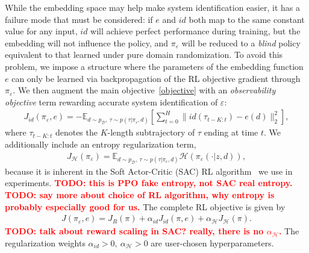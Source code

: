 \documentclass{article}
\newcommand{\E}{\mathbb{E}}
\newcommand{\TODO}[1]{\textcolor{red}{\textbf{TODO: #1}}}
\newcommand{\cH}{\mathcal{H}}
\newcommand{\cN}{\mathcal{N}}
\newcommand{\blind}{\emph{blind}}
\newcommand{\embedfn}{e}
\newcommand{\idfn}{id}
\newcommand{\idset}{\mathcal{D}}
\newcommand{\obvar}{z}
\newcommand{\idvar}{d}
\newcommand{\idpdf}{p_{\idset}}
\newcommand{\latvar}{\varepsilon}
\begin{document}
While the embedding space may help make system identification easier,
it has a failure mode that must be considered:
if $\embedfn$ and $\idfn$ both map to the same constant value for any input,
$\idfn$ will achieve perfect performance during training,
but the embedding will not influence the policy, and $\pi_\latvar$ will be reduced to a \blind{} policy
equivalent to that learned under pure domain randomization.
To avoid this problem, we impose a structure where the parameters of the embedding function $e$
can only be learned via backpropagation of the RL objective gradient through $\pi_\latvar$.
We then augment the main objective~\eqref{objective} with an \emph{observability objective} term
rewarding accurate system identification of $\latvar$:
\begin{equation}\begin{split}
J_{\idfn}(\pi_\latvar, \embedfn) =
-\E_{\idvar \sim \idpdf,\ \tau \sim p(\tau|\pi_\latvar,\idvar)}
\left[
\sum_{t = 0}^{H} \| \idfn(\tau_{t-K:t}) - \embedfn(\idvar) \|_2^2
\right],
\label{objective-observability}
\end{split}\end{equation}
where $\tau_{t-K:t}$ denotes the $K$-length subtrajectory of $\tau$ ending at time $t$.
We additionally include an entropy regularization term,
\begin{equation}\begin{split}
J_{\cH}(\pi_\latvar) =
\E_{\idvar \sim \idpdf,\ \tau \sim p(\tau|\pi_\latvar,\idvar)}
\cH(\pi_\latvar(\cdot |\obvar, \idvar)),
\label{objective-entropy}
\end{split}\end{equation}
because it is inherent in the Soft Actor-Critic (SAC) RL algorithm~\citep{haarnoja-soft-actor-critic} we use in experiments.
\TODO{this is PPO fake entropy, not SAC real entropy.}
\TODO{say more about choice of RL algorithm, why entropy is probably especially good for us.}
The complete RL objective is given by
\begin{equation}\begin{split}
J(\pi_\latvar, \embedfn) = J_R(\pi) + \alpha_{id} J_{\idfn}(\pi, \embedfn) + \alpha_{\cH} J_{\cH}(\pi).
\label{objective-full}
\end{split}\end{equation}
\TODO{talk about reward scaling in SAC? really, there is no $\alpha_{\cH}$.}
The regularization weights $\alpha_{id} > 0,\ \alpha_{\cH} > 0$ are user-chosen hyperparameters.
\end{document}
